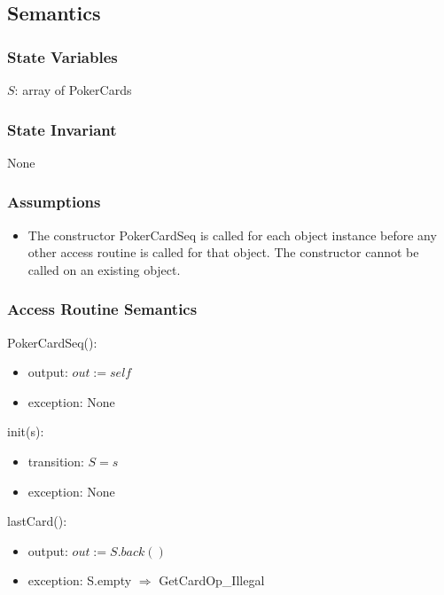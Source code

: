 \documentclass[12pt]{article}
\begin{document}
\subsection* {Semantics}

\subsubsection* {State Variables}

$S$: array of PokerCards

\subsubsection* {State Invariant}

None

\subsubsection* {Assumptions}

\begin{itemize}
\item The constructor PokerCardSeq is called for each object instance before any other
access routine is called for that object.  The constructor cannot be called on
an existing object.
\end{itemize}

\subsubsection* {Access Routine Semantics}

PokerCardSeq():
\begin{itemize}
\item output: $out := \mathit{self}$
\item exception: None
\end{itemize}

\noindent init(s):
\begin{itemize}
\item transition: $S=s$
\item exception: None
\end{itemize}

\noindent lastCard():
\begin{itemize}
\item output: $out := S.back()$
\item exception: S.empty $\Rightarrow$ GetCardOp\_Illegal
\end{itemize}
\end{document}
